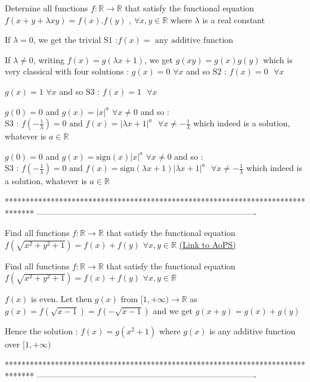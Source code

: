 \begin{solution}
	\begin{tcolorbox}Deternine all functions $f : \mathbb{R}\rightarrow \mathbb{R}$ that satisfy the functional equation
$ f (  x+y + \lambda xy)=f ( x  ). f ( y )$  , $\forall x,y\in \mathbb{R}$
where $\lambda$ is a real constant\end{tcolorbox}
If $\lambda=0$, we get the trivial $\boxed{\text{S1 :}f(x)=\text{ any additive function}}$

If $\lambda\ne 0$, writing $f(x)=g(\lambda x+1)$, we get $g(xy)=g(x)g(y)$ which is very classical with four solutions :
$g(x)=0$ $\forall x$ and so $\boxed{\text{S2 : }f(x)=0\text{   }\forall x}$

$g(x)=1$ $\forall x$ and so $\boxed{\text{S3 : }f(x)=1\text{   }\forall x}$

$g(0)=0$ and $g(x)=|x|^a$ $\forall x\ne 0$ and so :
$\boxed{\text{S3 : }f(-\frac 1{\lambda})=0\text{ and }f(x)=|\lambda x+1|^a\text{   }\forall x\ne -\frac 1{\lambda}}$ which indeed is a solution, whatever is $a\in\mathbb R$

$g(0)=0$ and $g(x)=\text{sign}(x)|x|^a$ $\forall x\ne 0$ and so :
$\boxed{\text{S3 : }f(-\frac 1{\lambda})=0\text{ and }f(x)=\text{sign}(\lambda x + 1)|\lambda x+1|^a\text{   }\forall x\ne -\frac 1{\lambda}}$ which indeed is a solution, whatever is $a\in\mathbb R$
\end{solution}
*******************************************************************************
-------------------------------------------------------------------------------

\begin{problem}
	Find all functions $f : \mathbb{R}\rightarrow \mathbb{R}$ that satisfy the functional equation
$ f ( \sqrt{x^{2}+y^{2}+1})=f ( x  )+ f ( y )$  
$\forall x,y\in \mathbb{R}$
	\flushright \href{https://artofproblemsolving.com/community/c6h591645}{(Link to AoPS)}
\end{problem}



\begin{solution}
	\begin{tcolorbox}Find all functions $f : \mathbb{R}\rightarrow \mathbb{R}$ that satisfy the functional equation
$ f ( \sqrt{x^{2}+y^{2}+1})=f ( x  )+ f ( y )$  
$\forall x,y\in \mathbb{R}$\end{tcolorbox}
$f(x)$ is even. Let then $g(x)$ from $[1,+\infty)\to \mathbb R$ as $g(x)=f(\sqrt{x-1})=f(-\sqrt{x-1})$ and we get $g(x+y)=g(x)+g(y)$

Hence the solution : $\boxed{f(x)=g(x^2+1)}$ where $g(x)$ is any additive function over $[1,+\infty)$
\end{solution}
*******************************************************************************
-------------------------------------------------------------------------------

